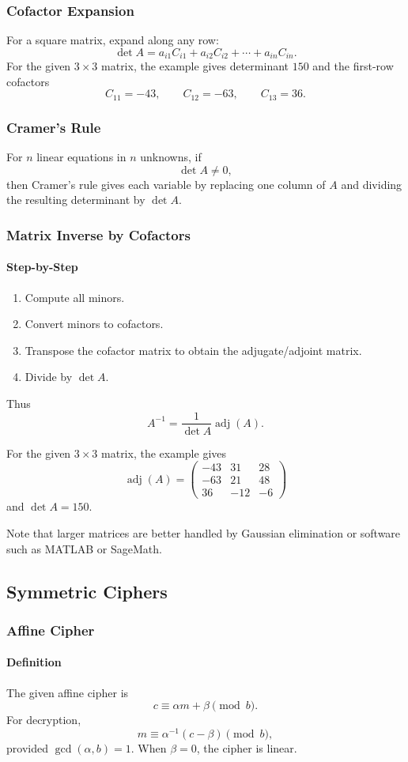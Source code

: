 \documentclass[12pt]{article}
\newcommand{\Definition}{\paragraph{Definition}}
\newcommand{\Step}{\paragraph{Step-by-Step}}
\begin{document}
\subsubsection{Cofactor Expansion}
For a square matrix, expand along any row:
\[
\det A=a_{i1}C_{i1}+a_{i2}C_{i2}+\cdots+a_{in}C_{in}.
\]
For the given $3\times3$ matrix, the example gives determinant $150$ and the first-row cofactors
\[
C_{11}=-43,\qquad C_{12}=-63,\qquad C_{13}=36.
\]

\subsubsection{Cramer's Rule}
For $n$ linear equations in $n$ unknowns, if
\[
\det A\ne0,
\]
then Cramer's rule gives each variable by replacing one column of $A$ and dividing the resulting determinant by $\det A$.

\subsubsection{Matrix Inverse by Cofactors}
\Step
\begin{enumerate}
    \item Compute all minors.
    \item Convert minors to cofactors.
    \item Transpose the cofactor matrix to obtain the adjugate/adjoint matrix.
    \item Divide by $\det A$.
\end{enumerate}
Thus
\[
A^{-1}=\frac{1}{\det A}\operatorname{adj}(A).
\]

For the given $3\times3$ matrix, the example gives
\[
\operatorname{adj}(A)=
\begin{pmatrix}
-43&31&28\\
-63&21&48\\
36&-12&-6
\end{pmatrix}
\]
and $\det A=150$.

Note that larger matrices are better handled by Gaussian elimination or software such as MATLAB or SageMath.

\subsection{Symmetric Ciphers}
\subsubsection{Affine Cipher}
\Definition The given affine cipher is
\[
c\equiv \alpha m+\beta\pmod b.
\]
For decryption,
\[
m\equiv\alpha^{-1}(c-\beta)\pmod b,
\]
provided $\gcd(\alpha,b)=1$. When $\beta=0$, the cipher is linear.
\end{document}
